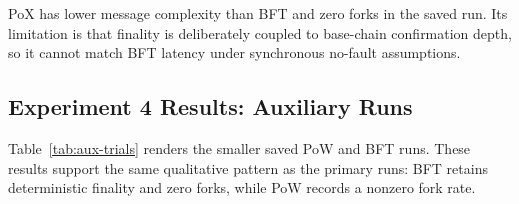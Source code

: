 \documentclass[11pt]{article}
\begin{document}
\begin{table}[t]
\centering
\caption{PoX trial-level results read from the saved Phase 12 CSV.}
\label{tab:pox-trials}
\end{table}

PoX has lower message complexity than BFT and zero forks in the saved run. Its limitation is that finality is deliberately coupled to base-chain confirmation depth, so it cannot match BFT latency under synchronous no-fault assumptions.

\subsection{Experiment 4 Results: Auxiliary Runs}

Table~\ref{tab:aux-trials} renders the smaller saved PoW and BFT runs. These results support the same qualitative pattern as the primary runs: BFT retains deterministic finality and zero forks, while PoW records a nonzero fork rate.
\end{document}
